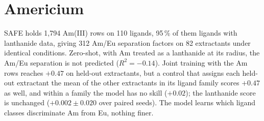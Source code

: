 \section{Americium}
\label{app:am}
SAFE holds 1{,}794 Am(III) rows on 110 ligands, 95\,\% of them ligands with lanthanide data, giving 312 Am/Eu separation factors on 82 extractants under identical conditions. Zero-shot, with Am treated as a lanthanide at its radius, the Am/Eu separation is not predicted ($R^2 = -0.14$). Joint training with the Am rows reaches $+0.47$ on held-out extractants, but a control that assigns each held-out extractant the mean of the other extractants in its ligand family scores $+0.47$ as well, and within a family the model has no skill ($+0.02$); the lanthanide score is unchanged ($+0.002 \pm 0.020$ over paired seeds). The model learns which ligand classes discriminate Am from Eu, nothing finer.


